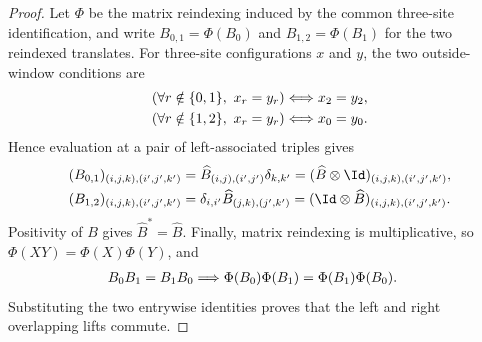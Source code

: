 \begin{proof}\leanok
    Let $\Phi$ be the matrix reindexing induced by the common three-site
    identification, and write $B_{0,1}=\Phi(B_0)$ and
    $B_{1,2}=\Phi(B_1)$ for the two reindexed translates. For three-site
    configurations $x$ and $y$, the two outside-window conditions are
    \begin{align}
        (\forall r\notin\{0,1\},\ x_r=y_r)
         & \Longleftrightarrow x_2=y_2,
        \notag                          \\
        (\forall r\notin\{1,2\},\ x_r=y_r)
         & \Longleftrightarrow x_0=y_0.
        \notag
    \end{align}
    Hence evaluation at a pair of left-associated triples gives
    \begin{align}
        (B_{0,1})_{(i,j,k),(i',j',k')}
         & =\widehat B_{(i,j),(i',j')}\delta_{k,k'}
        =(\widehat B\otimes\Id)_{(i,j,k),(i',j',k')},
        \notag                                      \\
        (B_{1,2})_{(i,j,k),(i',j',k')}
         & =\delta_{i,i'}\widehat B_{(j,k),(j',k')}
        =(\Id\otimes\widehat B)_{(i,j,k),(i',j',k')}.
        \notag
    \end{align}
    Positivity of $B$ gives $\widehat B^*=\widehat B$. Finally, matrix
    reindexing is multiplicative, so $\Phi(XY)=\Phi(X)\Phi(Y)$, and
    \begin{align}
        B_0B_1=B_1B_0
         & \Longrightarrow
        \Phi(B_0)\Phi(B_1)=\Phi(B_1)\Phi(B_0).
        \notag
    \end{align}
    Substituting the two entrywise identities proves that the left and right
    overlapping lifts commute.
\end{proof}

